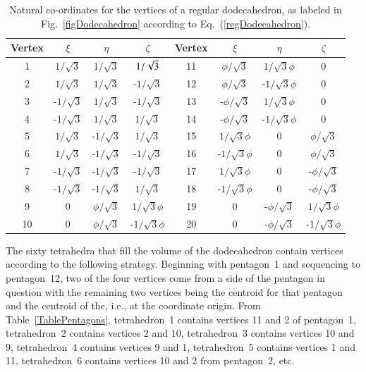 \begin{table}
	\begin{center}
	\begin{tabular}{|c|ccc||c|ccc|}
		\hline 
		Vertex & $\xi$ & $\eta$ & $\zeta$ & Vertex & $\xi$ & $\eta$ & $\zeta$ \\ \hline
		1 & $1 / \sqrt{3}$ & $1 / \sqrt{3}$ & $1 / \sqrt{3}^{\vphantom{|}}$ & 
		   11 & $\phi / \sqrt{3}$ & $1 / \sqrt{3} \phi$ & 0 \\
		2 & $1 / \sqrt{3}$ & $1 / \sqrt{3}$ & -$1 / \sqrt{3}$ & 
		   12 & $\phi / \sqrt{3}$ & -$1 / \sqrt{3}\phi$ & 0 \\
		3 & -$1 / \sqrt{3}$ & $1 / \sqrt{3}$ & -$1 / \sqrt{3}$ & 
		   13 & -$\phi / \sqrt{3}$ & $1/ \sqrt{3}\phi$ & 0 \\
		4 & -$1 / \sqrt{3}$ & $1 / \sqrt{3}$ & $1 / \sqrt{3}$ & 
		   14 & -$\phi / \sqrt{3}$ & -$1 / \sqrt{3}\phi$ & 0 \\
		5 & $1 / \sqrt{3}$ & -$1 / \sqrt{3}$ & $1 / \sqrt{3}$ & 
		   15 & $1 / \sqrt{3} \phi$ & 0 & $\phi / \sqrt{3}$ \\
		6 & $1 / \sqrt{3}$ & -$1 / \sqrt{3}$ & -$1 / \sqrt{3}$ & 
		   16 & -$1 / \sqrt{3}\phi$ & 0 & $\phi / \sqrt{3}$ \\
		7 & -$1 / \sqrt{3}$ & -$1 / \sqrt{3}$ & -$1 / \sqrt{3}$ & 
		   17 & $1 / \sqrt{3}\phi$ & 0 & -$\phi / \sqrt{3}$ \\
		8 & -$1 / \sqrt{3}$ & -$1 / \sqrt{3}$ & $1 / \sqrt{3}$ & 
		   18 & -$1 / \sqrt{3}\phi$ & 0 & -$\phi / \sqrt{3}$ \\
		9 & 0 & $\phi / \sqrt{3}$ & $1 / \sqrt{3}\phi$ & 
		   19 & 0 & -$\phi / \sqrt{3}$ & $1 / \sqrt{3}\phi$ \\
		10 & 0 & $\phi / \sqrt{3}$ & -$1 / \sqrt{3}\phi$ & 
		   20 & 0 & -$\phi / \sqrt{3}$ & -$1 / \sqrt{3}\phi$ \\
		\hline
	\end{tabular}
	\end{center}
	\caption{Natural co-ordinates for the vertices of a regular dodecahedron, as labeled in Fig.~\ref{figDodecahedron} according to Eq.~(\ref{regDodecahedron}).}
	\label{TableDodecahedron}
\end{table}

The sixty tetrahedra that fill the volume of the dodecahedron contain vertices according to the following strategy.  Beginning with pentagon~1 and sequencing to pentagon~12, two of the four vertices come from a side of the pentagon in question with the remaining two vertices being the centroid for that pentagon and the centroid of the, i.e., at the coordinate origin.  From Table~\ref{TablePentagons}, tetrahedron~1 contains vertices 11 and 2 of pentagon~1, tetrahedron~2 contains vertices 2 and 10, tetrahedron~3 contains vertices 10 and 9, tetrahedron~4 contains vertices 9 and 1, tetrahedron~5 contains vertices 1 and 11, tetrahedron~6 contains vertices 10 and 2 from pentagon~2, etc.

